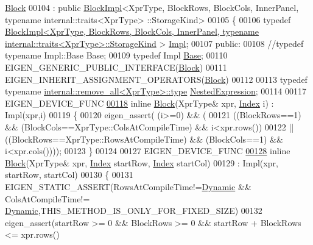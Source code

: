 \begin{DoxyCode}
      \hyperlink{group___core___module_class_eigen_1_1_block}{Block}
00104   : \textcolor{keyword}{public} \hyperlink{class_eigen_1_1_block_impl}{BlockImpl}<XprType, BlockRows, BlockCols, InnerPanel, typename internal::traits<XprType>
      ::StorageKind>
00105 \{
00106     \textcolor{keyword}{typedef} 
      \hyperlink{class_eigen_1_1_block_impl}{BlockImpl<XprType, BlockRows, BlockCols, InnerPanel, typename internal::traits<XprType>::StorageKind}
      > \hyperlink{class_eigen_1_1_block_impl}{Impl};
00107   \textcolor{keyword}{public}:
00108     \textcolor{comment}{//typedef typename Impl::Base Base;}
00109     \textcolor{keyword}{typedef} Impl \hyperlink{class_eigen_1_1_block_impl}{Base};
00110     EIGEN\_GENERIC\_PUBLIC\_INTERFACE(\hyperlink{group___core___module_class_eigen_1_1_block}{Block})
00111     EIGEN\_INHERIT\_ASSIGNMENT\_OPERATORS(\hyperlink{group___core___module_class_eigen_1_1_block}{Block})
00112     
00113     \textcolor{keyword}{typedef} \textcolor{keyword}{typename} \hyperlink{group___sparse_core___module}{internal::remove\_all<XprType>::type} 
      \hyperlink{group___sparse_core___module}{NestedExpression};
00114   
00117     EIGEN\_DEVICE\_FUNC
\hyperlink{group___core___module_ab45272f7223731c9a61937e55795c728}{00118}     \textcolor{keyword}{inline} \hyperlink{group___core___module_ab45272f7223731c9a61937e55795c728}{Block}(XprType& xpr, \hyperlink{namespace_eigen_a62e77e0933482dafde8fe197d9a2cfde}{Index} i) : Impl(xpr,i)
00119     \{
00120       eigen\_assert( (i>=0) && (
00121           ((BlockRows==1) && (BlockCols==XprType::ColsAtCompileTime) && i<xpr.rows())
00122         ||((BlockRows==XprType::RowsAtCompileTime) && (BlockCols==1) && i<xpr.cols())));
00123     \}
00124 
00127     EIGEN\_DEVICE\_FUNC
\hyperlink{group___core___module_afdf396b628ef3874414bbfc4ebd72ab4}{00128}     \textcolor{keyword}{inline} \hyperlink{group___core___module_afdf396b628ef3874414bbfc4ebd72ab4}{Block}(XprType& xpr, \hyperlink{namespace_eigen_a62e77e0933482dafde8fe197d9a2cfde}{Index} startRow, \hyperlink{namespace_eigen_a62e77e0933482dafde8fe197d9a2cfde}{Index} startCol)
00129       : Impl(xpr, startRow, startCol)
00130     \{
00131       EIGEN\_STATIC\_ASSERT(RowsAtCompileTime!=\hyperlink{namespace_eigen_ad81fa7195215a0ce30017dfac309f0b2}{Dynamic} && ColsAtCompileTime!=
      \hyperlink{namespace_eigen_ad81fa7195215a0ce30017dfac309f0b2}{Dynamic},THIS\_METHOD\_IS\_ONLY\_FOR\_FIXED\_SIZE)
00132       eigen\_assert(startRow >= 0 && BlockRows >= 0 && startRow + BlockRows <= xpr.rows()

\end{DoxyCode}
